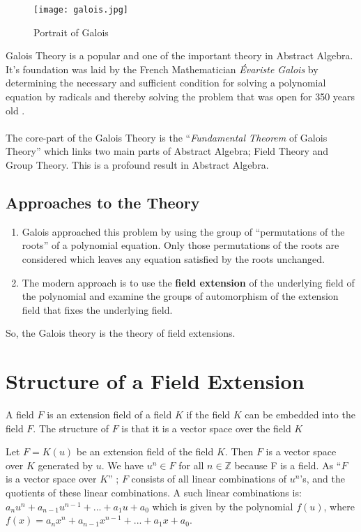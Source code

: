 \begin{wrapfigure}{r}{0.3\textwidth}
  \texttt{[image: galois.jpg]}
  \caption{\footnotesize Portrait of Galois}
\end{wrapfigure}

Galois Theory is a popular and one of the important theory in Abstract Algebra. It's foundation was laid by the French Mathematician \textit{Évariste Galois} by determining the necessary and sufficient condition for solving a polynomial equation by radicals and thereby solving the problem that was open for 350 years old \cite{galois}.\\ \\
The core-part of the Galois Theory is the ``\textit{Fundamental Theorem} of Galois Theory'' \cite {hunger}  which links two main parts of Abstract Algebra; Field Theory and Group Theory. This is a profound result in Abstract Algebra.

\vspace{15mm}
\subsection{Approaches to the Theory}
\begin{enumerate}
\item Galois approached this problem by using the group of ``permutations of the roots'' \cite{galois}  of a polynomial equation. Only those permutations of the roots are considered which leaves any equation satisfied by the roots unchanged.

\item The modern approach is to use the \textbf{field extension} of the underlying field of the polynomial and examine the groups of automorphism of the extension field that fixes the underlying field.
\end{enumerate}
So, the Galois theory is the theory of field extensions.
\clearpage

\section{Structure of a Field Extension}
A field \(F\) is an extension field of a field \(K\) if the field \(K\) can be embedded into the field \(F\).  The structure of \(F\) is that it is a vector space over the field \(K\) \cite{hunger}

Let \(F=K(u)\) be an extension field of the field \(K\). Then \(F\) is a vector space over \(K\) generated by \(u\). We have \(u^n \in F\) for all \(n \in \mathbb{Z}\) because F is a field. As ``\(F\) is a vector space over \(K\)'' \cite{hunger}; \(F\) consists of all linear combinations of \(u^n \)'s, and the quotients of these linear combinations. A such linear combinations is: \(a_nu^n+a_{n-1}u^{n-1}+...+a_1u+a_0\) which is  given by the polynomial \(f(u)\), where \(f(x)=a_nx^n+a_{n-1}x^{n-1}+...+a_1x+a_0\).\\

